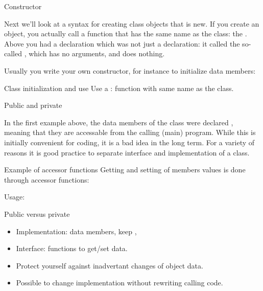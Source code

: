  {Constructor}

Next we'll look at a syntax for creating class objects that is new. If
you create an object, you actually call a function that has the same
name as the class: the .
Above you had a declaration  which was not just a
declaration: it called the so-called ,
which has no arguments, and does nothing.

Usually you write your own constructor,
for instance to initialize data members:
%

\begin{slide}{Class initialization and use}
  \label{sl:class-construct}
  Use a : function with same name as the class.
\end{slide}

 {Public and private}

In the first example above, the data members of the  class were
declared , meaning that they are accessable from the calling
(main) program. While this is initially convenient for coding, it is a bad idea
in the long term. For a variety of reasons it is good practice to
separate interface and implementation of a class.

\begin{block}{Example of accessor functions}
  \label{sl:pointaccess}
  Getting and setting of members values is done through accessor functions:
  \begin{multicols}{2}
  \end{multicols}
  Usage:
\end{block}

\begin{block}{Public versus private}
  \label{sl:interfaceimpl}
  \begin{itemize}
  \item Implementation: data members, keep ,
  \item Interface:  functions to get/set data.
  \item Protect yourself against inadvertant changes of object data.
  \item Possible to change implementation without rewriting calling code.
  \end{itemize}
\end{block}

